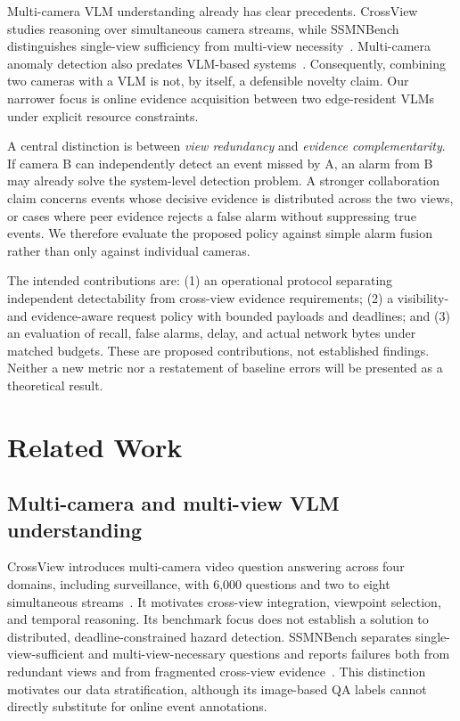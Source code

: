 \documentclass[10pt,a4paper]{article}
\begin{document}
Multi-camera VLM understanding already has clear precedents. CrossView studies reasoning over simultaneous camera streams, while SSMNBench distinguishes single-view sufficiency from multi-view necessity~\cite{crossview,ssmn}. Multi-camera anomaly detection also predates VLM-based systems~\cite{mcmil}. Consequently, combining two cameras with a VLM is not, by itself, a defensible novelty claim. Our narrower focus is online evidence acquisition between two edge-resident VLMs under explicit resource constraints.

A central distinction is between \emph{view redundancy} and \emph{evidence complementarity}. If camera B can independently detect an event missed by A, an alarm from B may already solve the system-level detection problem. A stronger collaboration claim concerns events whose decisive evidence is distributed across the two views, or cases where peer evidence rejects a false alarm without suppressing true events. We therefore evaluate the proposed policy against simple alarm fusion rather than only against individual cameras.

The intended contributions are: (1) an operational protocol separating independent detectability from cross-view evidence requirements; (2) a visibility- and evidence-aware request policy with bounded payloads and deadlines; and (3) an evaluation of recall, false alarms, delay, and actual network bytes under matched budgets. These are proposed contributions, not established findings. Neither a new metric nor a restatement of baseline errors will be presented as a theoretical result.

\newpage
\section{Related Work}
\subsection{Multi-camera and multi-view VLM understanding}
CrossView introduces multi-camera video question answering across four domains, including surveillance, with 6,000 questions and two to eight simultaneous streams~\cite{crossview}. It motivates cross-view integration, viewpoint selection, and temporal reasoning. Its benchmark focus does not establish a solution to distributed, deadline-constrained hazard detection. SSMNBench separates single-view-sufficient and multi-view-necessary questions and reports failures both from redundant views and from fragmented cross-view evidence~\cite{ssmn}. This distinction motivates our data stratification, although its image-based QA labels cannot directly substitute for online event annotations.
\end{document}

